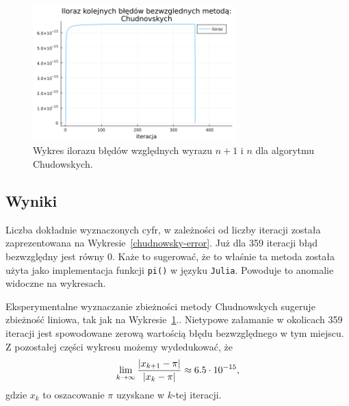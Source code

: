 \begin{figure}[!h]
    \centering
    \renewcommand{\figurename}{Wykres}
    \includegraphics[width=0.7\textwidth]{../prog/chudnowsky_error_ratio.png}
    \caption{Wykres ilorazu błędów względnych wyrazu $n+1$ i $n$ dla algorytmu Chudowskych.}
    \label{chudnowsky-convergence}
\end{figure}

\subsection{Wyniki}

Liczba dokładnie wyznaczonych cyfr, w zależności od liczby iteracji została zaprezentowana na Wykresie~\ref{chudnowsky-error}. Już dla 359 iteracji błąd bezwzględny jest równy 0. Każe to sugerować, że to właśnie ta metoda została użyta jako implementacja funkcji \verb+pi()+ w języku \verb+Julia+. Powoduje to anomalie widoczne na wykresach.

Eksperymentalne wyznaczanie zbieżności metody Chudnowskych sugeruje zbieżność liniowa, tak jak na Wykresie~\ref{chudnowsky-convergence}.. Nietypowe załamanie w okolicach 359 iteracji jest spowodowane zerową wartością błędu bezwzględnego w tym miejscu. Z pozostałej części wykresu możemy wydedukować, że
$$\lim_{k\to\infty}{{|x_{k+1}-\pi|\over |x_k-\pi|}}\approx 6.5\cdot 10^{-15},$$
gdzie $x_k$ to oszacowanie $\pi$ uzyskane w $k$-tej iteracji.